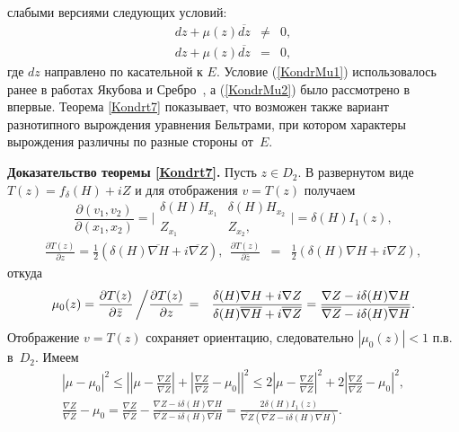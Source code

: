 слабыми версиями следующих условий:
\begin{eqnarray}
  dz+\mu(z)\overline{dz} &\ne& 0, \label{KondrMu1}\\
  dz+\mu(z)\overline{dz} &=& 0, \label{KondrMu2}
\end{eqnarray}
где $dz$ направлено по касательной к $E$. Условие (\ref{KondrMu1})  использовалось ранее в работах  Якубова и Сребро~\cite[теорема 4.4, c.~70]{KondrSrYak4}, а  (\ref{KondrMu2}) было рассмотрено в \cite{KondrSibMat,KondrVV2014} впервые.
Теорема \ref{Kondrt7} показывает,  что возможен также вариант разнотипного вырождения уравнения Бельтрами, при котором характеры вырождения различны по разные стороны от~$E$.


 \noindent\textbf{Доказательство теоремы \ref{Kondrt7}.} Пусть $z\in D_2$.
  В развернутом виде  $T(z)=f_{\delta}(H)+i Z$ и
для отображения
$v=T(z)$
получаем
$$\frac{\partial(v_1,v_2)}{\partial(x_1,x_2)}=\biggl|
\begin{array}{cc}
\delta(H) H_{x_1}&\delta(H) H_{x_2}\\
Z_{x_1}&Z_{x_2},
\end{array}
\biggr|=\delta(H) I_1(z),$$
\begin{eqnarray}
\frac{\partial T(z)}{\partial z}=\frac12\left(
\delta(H)\overline{\nabla H} +i\overline{\nabla Z}
\right),  \  \
\frac{\partial T(z)}{\partial {\bar z}}
&=&\frac12\left(
\delta(H)\nabla H +i\nabla Z
\right),
\nonumber
\end{eqnarray}
откуда
\begin{eqnarray}{\mu_0}(z)=\frac{\partial T(z)}{\partial {\bar z}}\left/
\frac{\partial T(z)}{\partial z}\right.&=&
\frac{\delta(H)\nabla H +i\nabla Z}{\delta(H)\overline{\nabla H} +i\overline{\nabla Z}}=
\frac{\nabla Z-i\delta(H)\nabla H}{\overline{\nabla Z}-i\delta(H)\overline{\nabla H}}
.\label{Kondrodinminusmuquadrat1}
\end{eqnarray}
Отображение $v=T(z)$ сохраняет ориентацию, следовательно ${|\mu_0(z)|<1}$ п.в.  в~$D_2$.
Имеем
\begin{eqnarray}\label{KondrOz1}
|\mu-{\mu_0}|^2\leq
\left| \left| \mu-\frac{\nabla
Z}{\overline{\nabla Z}}\right|+ \left|
\frac{\nabla Z}{\overline{\nabla Z}}-{\mu_0}
\right|\right|^2
\leq 2\left| \mu-\frac{\nabla
Z}{\overline{\nabla
Z}}\right|^2+2\left|\frac{\nabla
Z}{\overline{\nabla Z}}-{\mu_0} \right|^2,
\\
\frac{\nabla Z}{\overline{\nabla Z}}- {\mu_0}=
\frac{\nabla Z}{\overline{\nabla Z}}-
\frac{\nabla Z-i\delta(H)\nabla
H}{\overline{\nabla Z}-i\delta(H)\overline{\nabla
H}}=\frac{2\delta(H) I_1(z)}{\overline{\nabla Z}(\overline{\nabla Z}-i\delta(H)\overline{\nabla H})}.\label{KondrZ1}
\end{eqnarray}

